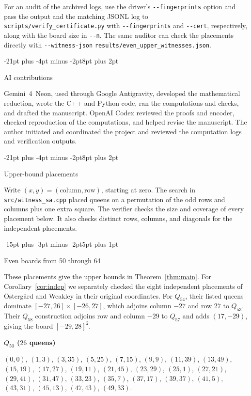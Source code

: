 \documentclass[11pt,a4paper]{article}
\makeatletter
\renewcommand{\section}{\@startsection{section}{1}{\z@}%
  {-21pt plus -4pt minus -2pt}{8pt plus 2pt}%
  {\normalfont\fontsize{14}{17}\selectfont\bfseries\raggedright}}
\renewcommand{\subsection}{\@startsection{subsection}{2}{\z@}%
  {-15pt plus -3pt minus -2pt}{5pt plus 1pt}%
  {\normalfont\bfseries\raggedright}}
\theoremstyle{result}
\theoremstyle{definition}
\theoremstyle{remark}
\newenvironment{placement}[1]{%
  \par\addvspace{7pt}\begin{samepage}%
  \noindent\textbf{#1}\par\nobreak\noindent\ignorespaces
}{\par\end{samepage}}
\makeatother
\begin{document}
For an audit of the archived logs, use the driver's
\texttt{-{}-fingerprints} option and pass the output and the
matching JSONL log to \nolinkurl{scripts/verify_certificate.py}
with \texttt{-{}-fingerprints} and \texttt{-{}-cert}, respectively,
along with the board size in \texttt{-{}-n}.
The same auditor can check the placements directly with
\texttt{-{}-witness-json} \nolinkurl{results/even_upper_witnesses.json}.

\section{AI contributions}\label{sec:provenance}

Gemini~4~Neon, used through Google Antigravity, developed the
mathematical reduction, wrote the C++ and Python code, ran the
computations and checks, and drafted the manuscript. OpenAI
Codex reviewed the proofs and encoder, checked reproduction of
the computations, and helped revise the manuscript. The author
initiated and coordinated the project and reviewed the
computation logs and verification outputs.

\appendix
\section{Upper-bound placements}\label{sec:witnesses}

Write $(x,y)=(\text{column},\text{row})$, starting at zero.
The search in \nolinkurl{src/witness_sa.cpp} placed queens on a
permutation of the odd rows and columns plus one extra square.
The verifier checks the size and coverage of every placement
below. It also checks distinct rows, columns, and diagonals
for the independent placements.

\subsection{Even boards from 50 through 64}

These placements give the upper bounds in Theorem~\ref{thm:main}.
For Corollary~\ref{cor:indep} we separately checked the eight
independent placements of \"Osterg\aa rd and Weakley
\cite[Section~5, p.~11]{OW2001} in their original coordinates.
For $Q_{54}$, their listed queens dominate $[-27,26]\times[-26,27]$,
which adjoins column $-27$ and row $27$ to $Q_{53}$.
Their $Q_{58}$ construction adjoins row and column $-29$ to $Q_{57}$
and adds $(17,-29)$, giving the board $[-29,28]^2$.

\begin{placement}{$Q_{50}$ ($26$ queens)}
$(0,0)$, $(1,3)$, $(3,35)$, $(5,25)$, $(7,15)$, $(9,9)$, $(11,39)$, $(13,49)$, $(15,19)$, $(17,27)$, $(19,11)$, $(21,45)$, $(23,29)$, $(25,1)$, $(27,21)$, $(29,41)$, $(31,47)$, $(33,23)$, $(35,7)$, $(37,17)$, $(39,37)$, $(41,5)$, $(43,31)$, $(45,13)$, $(47,43)$, $(49,33)$.
\end{placement}
\end{document}
